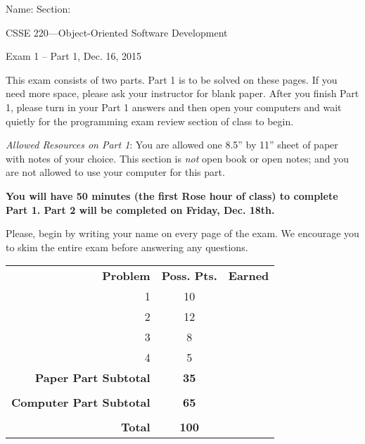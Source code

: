 \documentclass[12pt,twoside]{article}
\newcommand{\fillInBlank}[1][0.5in]{\underline{\hspace{#1}}}
\begin{document}

\begin{flushright}
Name: \fillInBlank[3in] Section: \fillInBlank[1in]

\LARGE{CSSE 220---Object-Oriented Software Development}

\Large{Exam 1 -- Part 1, Dec. 16, 2015}
\end{flushright}

This exam consists of two parts.  Part 1 is to be solved on these pages. If you need more space, please ask your instructor for blank paper.  After you finish Part 1, please turn in your Part 1 answers and then open your computers and wait quietly for the programming exam review section of class to begin.

\emph{Allowed Resources on Part 1}:  You are allowed one 8.5'' by 11'' sheet of paper with notes of your choice.  This section is \emph{not} open book or open notes; and you are not allowed to use your computer for this part.  

\begin{center}
\textbf{You will have 50 minutes (the first Rose hour of class) to complete Part 1. Part 2 will be completed on Friday, Dec. 18th.}
\end{center}

Please, begin by writing your name on every page of the exam. We encourage you to skim the
entire exam before answering any questions. 


\vfill

\begin{flushright}
\begin{tabular}{rcc}
\textbf{Problem} & \textbf{Poss. Pts.} & \textbf{Earned} \\
1 & 10 & \fillInBlank \\
2 & 12 & \fillInBlank \\
3 & 8 & \fillInBlank \\
4 & 5 & \fillInBlank \\
\textbf{Paper Part Subtotal} & \textbf{35} & \fillInBlank\\
 & & \\
\textbf{Computer Part Subtotal} & \textbf{65} & \fillInBlank\\
 & & \\
\textbf{Total} & \textbf{100} & \fillInBlank
\end{tabular}
\end{flushright}
\clearpage
\end{document}
